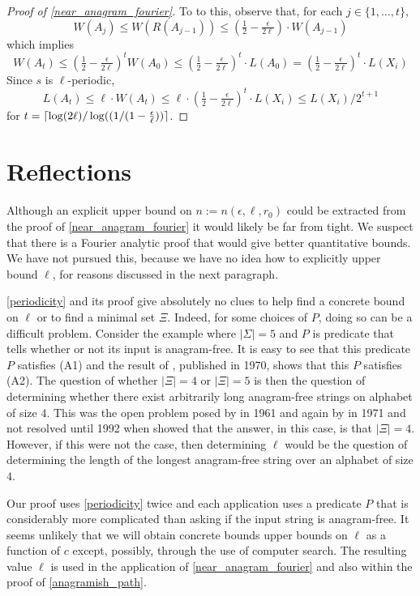 \documentclass{patmorin}
\begin{document}
\begin{proof}[Proof of \cref{near_anagram_fourier}]
  To to this, observe that, for each $j\in\{1,\ldots,t\}$,
  \begin{equation}
      W(A_j)
        \le W(R(A_{j-1}))
        \le (\tfrac12-\tfrac{\epsilon}{2\ell})\cdot W(A_{j-1})
  \end{equation}
  which implies
  \[
       W(A_t)
       \le (\tfrac12-\tfrac{\epsilon}{2\ell})^t W(A_0) \le (\tfrac12-\tfrac{\epsilon}{2\ell})^t\cdot L(A_0)
       =  (\tfrac12-\tfrac{\epsilon}{2\ell})^t\cdot L(X_i)
  \]
  Since $s$ is $\ell$-periodic,
  \[
        L(A_t)\le \ell\cdot W(A_t) \le \ell\cdot(\tfrac12-\tfrac{\epsilon}{2\ell})^t\cdot L(X_i) \le L(X_i)/2^{t+1}
  \]
  for $t = {\lceil \log(2\ell)/\log((1/(1-\tfrac{\epsilon}{\ell})) \rceil}$.
\end{proof}

\section{Reflections}

Although an explicit upper bound on $n:=n(\epsilon,\ell,r_0)$ could be extracted from the proof of \cref{near_anagram_fourier} it would likely be far from tight.  We suspect that there is a Fourier analytic proof that would give better quantitative bounds.  We have not pursued this, because we have no idea how to explicitly upper bound $\ell$, for reasons discussed in the next paragraph.

\cref{periodicity} and its proof give absolutely no clues to help find a concrete bound on $\ell$ or to find a minimal set $\Xi$. Indeed, for some choices of $P$, doing so can be a difficult problem.  Consider the example where $|\Sigma|=5$ and $P$ is predicate that tells whether or not its input is anagram-free. It is easy to see that this predicate $P$ satisfies (A1) and the result of \citet{pleasants:non-repetitive}, published in 1970, shows that this $P$ satisfies (A2).  The question of whether $|\Xi|=4$ or $|\Xi|=5$ is then the question of determining whether there exist arbitrarily long anagram-free strings on alphabet of size $4$.  This was the open problem posed by \citet{erdos:some} in 1961 and again by \citet{brown:is} in 1971 and not resolved until 1992 when \citet{keranen:abelian,keranen:powerful} showed that the answer, in this case, is that $|\Xi|=4$.  However, if this were not the case, then determining $\ell$ would be the question of determining the length of the longest anagram-free string over an alphabet of size $4$.

Our proof uses \cref{periodicity} twice and each application uses a predicate $P$ that is considerably more complicated than asking if the input string is anagram-free. It seems unlikely that we will obtain concrete bounds upper bounds on $\ell$ as a function of $c$ except, possibly, through the use of computer search. The resulting value $\ell$ is used in the application of \cref{near_anagram_fourier} and also within the proof of \cref{anagramish_path}.





\end{document}

